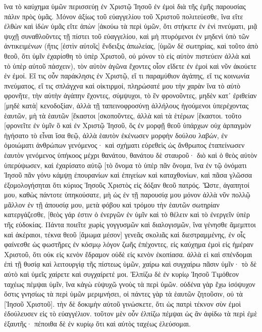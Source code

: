 ἵνα τὸ καύχημα ὑμῶν περισσεύῃ ἐν Χριστῷ Ἰησοῦ ἐν ἐμοὶ διὰ τῆς ἐμῆς παρουσίας πάλιν πρὸς ὑμᾶς. 
Μόνον ἀξίως τοῦ εὐαγγελίου τοῦ Χριστοῦ πολιτεύεσθε, ἵνα εἴτε ἐλθὼν καὶ ἰδὼν ὑμᾶς εἴτε ἀπὼν [ἀκούω τὰ περὶ ὑμῶν, ὅτι στήκετε ἐν ἑνὶ πνεύματι, μιᾷ ψυχῇ συναθλοῦντες τῇ πίστει τοῦ εὐαγγελίου, 
καὶ μὴ πτυρόμενοι ἐν μηδενὶ ὑπὸ τῶν ἀντικειμένων (ἥτις [ἐστὶν αὐτοῖς] ἔνδειξις ἀπωλείας, [ὑμῶν δὲ σωτηρίας, καὶ τοῦτο ἀπὸ θεοῦ, 
ὅτι ὑμῖν ἐχαρίσθη τὸ ὑπὲρ Χριστοῦ, οὐ μόνον τὸ εἰς αὐτὸν πιστεύειν ἀλλὰ καὶ τὸ ὑπὲρ αὐτοῦ πάσχειν), 
τὸν αὐτὸν ἀγῶνα ἔχοντες οἷον εἴδετε ἐν ἐμοὶ καὶ νῦν ἀκούετε ἐν ἐμοί. 
Εἴ τις οὖν παράκλησις ἐν Χριστῷ, εἴ τι παραμύθιον ἀγάπης, εἴ τις κοινωνία πνεύματος, εἴ τις σπλάγχνα καὶ οἰκτιρμοί, 
πληρώσατέ μου τὴν χαρὰν ἵνα τὸ αὐτὸ φρονῆτε, τὴν αὐτὴν ἀγάπην ἔχοντες, σύμψυχοι, τὸ ἓν φρονοῦντες, 
μηδὲν κατ᾽ ἐριθείαν [μηδὲ κατὰ] κενοδοξίαν, ἀλλὰ τῇ ταπεινοφροσύνῃ ἀλλήλους ἡγούμενοι ὑπερέχοντας ἑαυτῶν, 
μὴ τὰ ἑαυτῶν [ἕκαστοι [σκοποῦντες, ἀλλὰ καὶ τὰ ἑτέρων [ἕκαστοι. 
τοῦτο [φρονεῖτε ἐν ὑμῖν ὃ καὶ ἐν Χριστῷ Ἰησοῦ, 
ὃς ἐν μορφῇ θεοῦ ὑπάρχων οὐχ ἁρπαγμὸν ἡγήσατο τὸ εἶναι ἴσα θεῷ, 
ἀλλὰ ἑαυτὸν ἐκένωσεν μορφὴν δούλου λαβών, ἐν ὁμοιώματι ἀνθρώπων γενόμενος· καὶ σχήματι εὑρεθεὶς ὡς ἄνθρωπος 
ἐταπείνωσεν ἑαυτὸν γενόμενος ὑπήκοος μέχρι θανάτου, θανάτου δὲ σταυροῦ· 
διὸ καὶ ὁ θεὸς αὐτὸν ὑπερύψωσεν, καὶ ἐχαρίσατο αὐτῷ [τὸ ὄνομα τὸ ὑπὲρ πᾶν ὄνομα, 
ἵνα ἐν τῷ ὀνόματι Ἰησοῦ πᾶν γόνυ κάμψῃ ἐπουρανίων καὶ ἐπιγείων καὶ καταχθονίων, 
καὶ πᾶσα γλῶσσα ἐξομολογήσηται ὅτι κύριος Ἰησοῦς Χριστὸς εἰς δόξαν θεοῦ πατρός. 
Ὥστε, ἀγαπητοί μου, καθὼς πάντοτε ὑπηκούσατε, μὴ ὡς ἐν τῇ παρουσίᾳ μου μόνον ἀλλὰ νῦν πολλῷ μᾶλλον ἐν τῇ ἀπουσίᾳ μου, μετὰ φόβου καὶ τρόμου τὴν ἑαυτῶν σωτηρίαν κατεργάζεσθε, 
[θεὸς γάρ ἐστιν ὁ ἐνεργῶν ἐν ὑμῖν καὶ τὸ θέλειν καὶ τὸ ἐνεργεῖν ὑπὲρ τῆς εὐδοκίας. 
Πάντα ποιεῖτε χωρὶς γογγυσμῶν καὶ διαλογισμῶν, 
ἵνα γένησθε ἄμεμπτοι καὶ ἀκέραιοι, τέκνα θεοῦ [ἄμωμα μέσον] γενεᾶς σκολιᾶς καὶ διεστραμμένης, ἐν οἷς φαίνεσθε ὡς φωστῆρες ἐν κόσμῳ 
λόγον ζωῆς ἐπέχοντες, εἰς καύχημα ἐμοὶ εἰς ἡμέραν Χριστοῦ, ὅτι οὐκ εἰς κενὸν ἔδραμον οὐδὲ εἰς κενὸν ἐκοπίασα. 
ἀλλὰ εἰ καὶ σπένδομαι ἐπὶ τῇ θυσίᾳ καὶ λειτουργίᾳ τῆς πίστεως ὑμῶν, χαίρω καὶ συγχαίρω πᾶσιν ὑμῖν· 
τὸ δὲ αὐτὸ καὶ ὑμεῖς χαίρετε καὶ συγχαίρετέ μοι. 
Ἐλπίζω δὲ ἐν κυρίῳ Ἰησοῦ Τιμόθεον ταχέως πέμψαι ὑμῖν, ἵνα κἀγὼ εὐψυχῶ γνοὺς τὰ περὶ ὑμῶν. 
οὐδένα γὰρ ἔχω ἰσόψυχον ὅστις γνησίως τὰ περὶ ὑμῶν μεριμνήσει, 
οἱ πάντες γὰρ τὰ ἑαυτῶν ζητοῦσιν, οὐ τὰ [Ἰησοῦ Χριστοῦ]. 
τὴν δὲ δοκιμὴν αὐτοῦ γινώσκετε, ὅτι ὡς πατρὶ τέκνον σὺν ἐμοὶ ἐδούλευσεν εἰς τὸ εὐαγγέλιον. 
τοῦτον μὲν οὖν ἐλπίζω πέμψαι ὡς ἂν ἀφίδω τὰ περὶ ἐμὲ ἐξαυτῆς· 
πέποιθα δὲ ἐν κυρίῳ ὅτι καὶ αὐτὸς ταχέως ἐλεύσομαι. 
